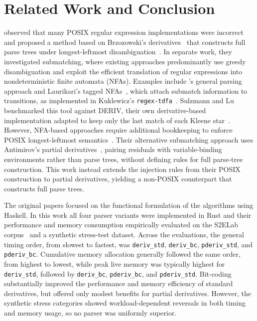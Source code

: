 \chapter{Related Work and Conclusion}
\label{sec:related}


\citet[p.~1]{sulzmannlu2014} observed that many POSIX
regular expression implementations were incorrect
and proposed a method based on Brzozowski's
derivatives~\citep{brzozowski1964} that constructs
full parse trees under longest-leftmost
disambiguation~\citep[Fig.~3]{sulzmannlu2014}.
In separate work, they investigated submatching,
where existing approaches predominantly use greedy
disambiguation and exploit the efficient translation
of regular expressions into nondeterministic finite
automata (NFAs).
Examples include \citet{frischcardelli2004}'s
general parsing approach and Laurikari's tagged
NFAs~\citep{laurikari2000}, which attach submatch
information to transitions, as implemented in
Kuklewicz's \texttt{regex-tdfa}~\citep{kuklewicz_tdfa}.
Sulzmann and Lu benchmarked this tool against DERIV, 
their own derivative-based implementation adapted to keep only the last
match of each Kleene star~\citep[p.~14]{sulzmannlu2014}.
However, NFA-based approaches require additional
bookkeeping to enforce POSIX longest-leftmost
semantics~\citep[p.~89]{sulzmannlu2012}.
Their alternative submatching approach uses
Antimirov's partial derivatives~\citep{antimirov1996},
pairing residuals with variable-binding environments
rather than parse trees, without defining rules
for full parse-tree construction.
This work instead extends the injection rules
from their POSIX construction
\citep[Fig.~3]{sulzmannlu2014}
to partial derivatives, yielding a non-POSIX
counterpart that constructs full parse trees.

The original papers focused on the functional formulation
of the algorithms using Haskell.
In this work all four parser variants were implemented in Rust
and their performance and memory consumption empirically evaluated
on the S2ELab corpus~\citep{s2elab-regexeval-dataset}
and a synthetic stress-test dataset.
Across the evaluations, the general timing order,
from slowest to fastest, was
\texttt{deriv\_std}, \texttt{deriv\_bc},
\texttt{pderiv\_std}, and \texttt{pderiv\_bc}.
Cumulative memory allocation generally followed
the same order, from highest to lowest,
while peak live memory was typically highest
for \texttt{deriv\_std}, followed by
\texttt{deriv\_bc}, \texttt{pderiv\_bc},
and \texttt{pderiv\_std}.
Bit-coding substantially improved the performance
and memory efficiency of standard derivatives,
but offered only modest benefits for partial derivatives.
However, the synthetic stress categories showed
workload-dependent reversals in both timing
and memory usage, so no parser was uniformly superior.

